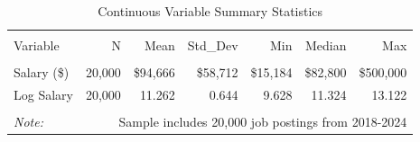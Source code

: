 \begin{table}[!htbp] \centering
\caption{Continuous Variable Summary Statistics}
\label{tab:continuous_vars}
\begin{tabular}{lrrrrrr}
\\[-1.8ex]\hline
\hline \\[-1.8ex]
Variable & N & Mean & Std\_Dev & Min & Median & Max \\
\hline \\[-1.8ex]
Salary (\$) & 20,000 & \$94,666 & \$58,712 & \$15,184 & \$82,800 & \$500,000 \\
Log Salary & 20,000 & 11.262 & 0.644 & 9.628 & 11.324 & 13.122 \\
\hline
\hline \\[-1.8ex]
\textit{Note:} & \multicolumn{6}{r}{Sample includes 20,000 job postings from 2018-2024} \\
\end{tabular}
\end{table}
